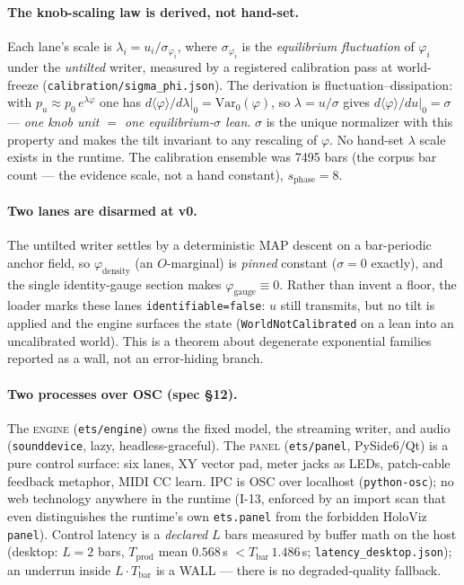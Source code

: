\documentclass[11pt]{article}
\newcommand{\code}[1]{\texttt{\small #1}}
\begin{document}
\paragraph{The knob-scaling law is derived, not hand-set.} Each lane's scale is
$\lambda_i = u_i/\sigma_{\varphi_i}$, where $\sigma_{\varphi_i}$ is the
\emph{equilibrium fluctuation} of $\varphi_i$ under the \emph{untilted} writer,
measured by a registered calibration pass at world-freeze
(\code{calibration/sigma\_phi.json}). The derivation is
fluctuation--dissipation: with $p_u \approx p_0\, e^{\lambda\varphi}$ one has
$d\langle\varphi\rangle/d\lambda|_0 = \mathrm{Var}_0(\varphi)$, so
$\lambda = u/\sigma$ gives $d\langle\varphi\rangle/du|_0 = \sigma$ --- \emph{one
knob unit $=$ one equilibrium-$\sigma$ lean}. $\sigma$ is the unique normalizer
with this property and makes the tilt invariant to any rescaling of $\varphi$. No
hand-set $\lambda$ scale exists in the runtime. The calibration ensemble was 7495
bars (the corpus bar count --- the evidence scale, not a hand constant),
$s_{\text{phase}}=8$.

\paragraph{Two lanes are disarmed at v0.} The untilted writer settles by a
deterministic MAP descent on a bar-periodic anchor field, so $\varphi_{\text{density}}$
(an $O$-marginal) is \emph{pinned} constant ($\sigma=0$ exactly), and the single
identity-gauge section makes $\varphi_{\text{gauge}}\equiv 0$. Rather than invent a
floor, the loader marks these lanes \code{identifiable=false}: $u$ still transmits,
but no tilt is applied and the engine surfaces the state (\code{WorldNotCalibrated}
on a lean into an uncalibrated world). This is a theorem about degenerate
exponential families reported as a wall, not an error-hiding branch.

\paragraph{Two processes over OSC (spec \S12).} The \textsc{engine}
(\code{ets/engine}) owns the fixed model, the streaming writer, and audio
(\code{sounddevice}, lazy, headless-graceful). The \textsc{panel}
(\code{ets/panel}, PySide6/Qt) is a pure control surface: six lanes, XY vector pad,
meter jacks as LEDs, patch-cable feedback metaphor, MIDI CC learn. IPC is OSC over
localhost (\code{python-osc}); no web technology anywhere in the runtime (I-13,
enforced by an import scan that even distinguishes the runtime's own
\code{ets.panel} from the forbidden HoloViz \code{panel}). Control latency is a
\emph{declared} $L$ bars measured by buffer math on the host (desktop: $L=2$ bars,
$T_{\text{prod}}$ mean $0.568$\,s $< T_{\text{bar}}\,1.486$\,s;
\code{latency\_desktop.json}); an underrun inside $L\cdot T_{\text{bar}}$ is a WALL
--- there is no degraded-quality fallback.
\end{document}
